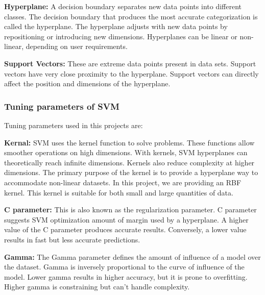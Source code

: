 \vspace{-1em}
\textbf{Hyperplane:} A decision boundary separates new data points into different classes. The decision boundary that produces the most accurate categorization is called the hyperplane. The hyperplane adjusts with new data points by repositioning or introducing new dimensions. Hyperplanes can be linear or non-linear, depending on user requirements.

\vspace{-1em}
\textbf{Support Vectors:} These are extreme data points present in data sets. Support vectors have very close proximity to the hyperplane. Support vectors can directly affect the position and dimensions of the hyperplane.

\subsubsection{Tuning parameters of SVM}
\vspace{-0.5em}
Tuning parameters used in this projects are:

\vspace{-1em}
\textbf{Kernal:} SVM uses the kernel function to solve problems. These functions allow smoother operations on high dimensions. With kernels, SVM hyperplanes can theoretically reach infinite dimensions. Kernels also reduce complexity at higher dimensions. The primary purpose of the kernel is to provide a hyperplane way to accommodate non-linear datasets. In this project, we are providing an RBF kernel. This kernel is suitable for both small and large quantities of data.

\vspace{-1em}
\textbf{C parameter:} This is also known as the regularization parameter. C parameter suggests SVM optimization amount of margin used by a hyperplane. A higher value of the C parameter produces accurate results. Conversely, a lower value results in fast but less accurate predictions.

\vspace{-1em}
\textbf{Gamma:} The Gamma parameter defines the amount of influence of a model over the dataset. Gamma is inversely proportional to the curve of influence of the model. Lower gamma results in higher accuracy, but it is prone to overfitting. Higher gamma is constraining but can't handle complexity.

